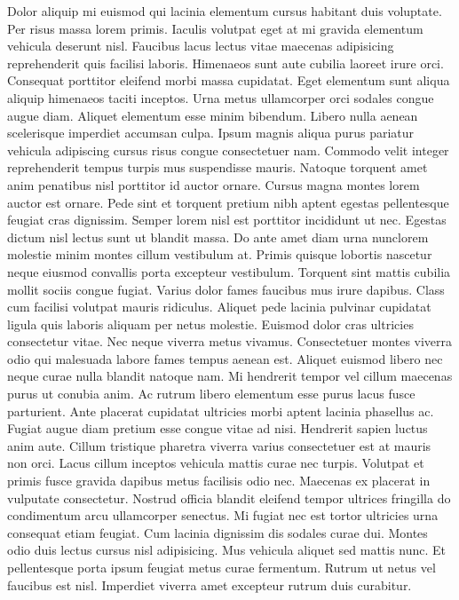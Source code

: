 Dolor aliquip mi euismod qui lacinia elementum cursus habitant duis voluptate. Per risus massa lorem primis. Iaculis volutpat eget at mi gravida elementum vehicula deserunt nisl. Faucibus lacus lectus vitae maecenas adipisicing reprehenderit quis facilisi laboris. Himenaeos sunt aute cubilia laoreet irure orci. Consequat porttitor eleifend morbi massa cupidatat. Eget elementum sunt aliqua aliquip himenaeos taciti inceptos.
Urna metus ullamcorper orci sodales congue augue diam. Aliquet elementum esse minim bibendum. Libero nulla aenean scelerisque imperdiet accumsan culpa. Ipsum magnis aliqua purus pariatur vehicula adipiscing cursus risus congue consectetuer nam. Commodo velit integer reprehenderit tempus turpis mus suspendisse mauris. Natoque torquent amet anim penatibus nisl porttitor id auctor ornare. Cursus magna montes lorem auctor est ornare.
Pede sint et torquent pretium nibh aptent egestas pellentesque feugiat cras dignissim. Semper lorem nisl est porttitor incididunt ut nec. Egestas dictum nisl lectus sunt ut blandit massa. Do ante amet diam urna nunclorem molestie minim montes cillum vestibulum at. Primis quisque lobortis nascetur neque eiusmod convallis porta excepteur vestibulum.
Torquent sint mattis cubilia mollit sociis congue fugiat. Varius dolor fames faucibus mus irure dapibus. Class cum facilisi volutpat mauris ridiculus. Aliquet pede lacinia pulvinar cupidatat ligula quis laboris aliquam per netus molestie. Euismod dolor cras ultricies consectetur vitae. Nec neque viverra metus vivamus. Consectetuer montes viverra odio qui malesuada labore fames tempus aenean est. Aliquet euismod libero nec neque curae nulla blandit natoque nam. Mi hendrerit tempor vel cillum maecenas purus ut conubia anim.
Ac rutrum libero elementum esse purus lacus fusce parturient. Ante placerat cupidatat ultricies morbi aptent lacinia phasellus ac. Fugiat augue diam pretium esse congue vitae ad nisi. Hendrerit sapien luctus anim aute. Cillum tristique pharetra viverra varius consectetuer est at mauris non orci. Lacus cillum inceptos vehicula mattis curae nec turpis. Volutpat et primis fusce gravida dapibus metus facilisis odio nec. Maecenas ex placerat in vulputate consectetur. Nostrud officia blandit eleifend tempor ultrices fringilla do condimentum arcu ullamcorper senectus.
Mi fugiat nec est tortor ultricies urna consequat etiam feugiat. Cum lacinia dignissim dis sodales curae dui. Montes odio duis lectus cursus nisl adipisicing. Mus vehicula aliquet sed mattis nunc. Et pellentesque porta ipsum feugiat metus curae fermentum. Rutrum ut netus vel faucibus est nisl. Imperdiet viverra amet excepteur rutrum duis curabitur.

